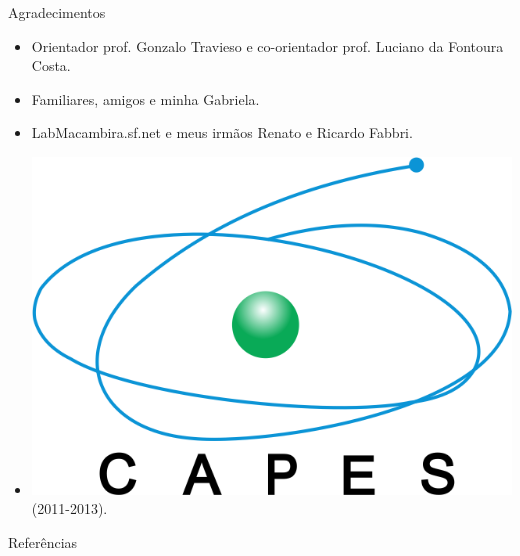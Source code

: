 \documentclass{beamer}
\begin{document}
\begin{frame}{Agradecimentos}
  \begin{itemize}
    \item Orientador prof. Gonzalo Travieso e co-orientador prof. Luciano da Fontoura Costa.

    \item Familiares, amigos e minha Gabriela.

    \item LabMacambira.sf.net e meus irmãos Renato e Ricardo Fabbri.

    \item \includegraphics[scale=.3]{figs/logo_capes} (2011-2013).
  \end{itemize}

\end{frame}

 \nocite{*}


\begin{frame}[allowframebreaks]{Referências}

%

%

\end{frame}
\end{document}
